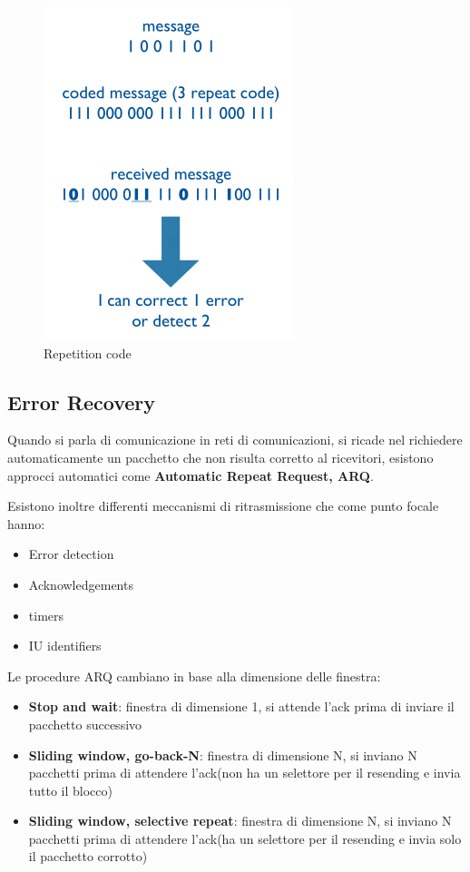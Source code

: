 \begin{figure}[!ht]
	\centering
	\includegraphics[width=0.4\columnwidth]{./images/repetition_code.png}
	\caption{Repetition code}
	\label{fig_repetition_code}
\end{figure}


\subsection{Error Recovery}
Quando si parla di comunicazione in reti di comunicazioni, si ricade nel richiedere automaticamente
un pacchetto che non risulta corretto al ricevitori,
esistono approcci automatici come \textbf{Automatic Repeat Request, ARQ}.

Esistono inoltre differenti meccanismi di ritrasmissione che come punto focale hanno:
\begin{itemize}
	\item Error detection
	\item Acknowledgements
	\item timers
	\item IU identifiers
\end{itemize}


Le procedure ARQ cambiano in base alla dimensione delle finestra:
\begin{itemize}
	\item \textbf{Stop and wait}: finestra di dimensione 1, si attende l'ack prima di inviare il pacchetto successivo
	\item \textbf{Sliding window, go-back-N}: finestra di dimensione N, si inviano N pacchetti prima di attendere l'ack(non ha un selettore per il resending e invia tutto il blocco)
	\item \textbf{Sliding window, selective repeat}: finestra di dimensione N, si inviano N pacchetti prima di attendere l'ack(ha un selettore per il resending e invia solo il pacchetto corrotto)
\end{itemize}


